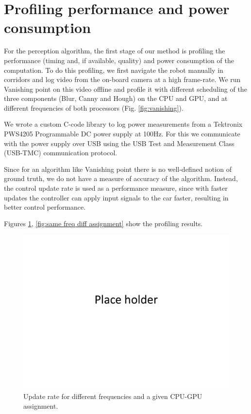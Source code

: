 \section{Profiling performance and power consumption}

For the perception algorithm, the first stage of our method is profiling the performance (timing and, if available, quality) and power consumption of the computation. 
To do this profiling, we first navigate the robot manually in corridors and log video from the on-board camera at a high frame-rate. 
We run Vanishing point on this video offline and profile it with different scheduling of the three components (Blur, Canny and Hough) on the CPU and GPU, and at different frequencies of both processors (Fig. \ref{fig:vanishing}).

We wrote a custom C-code library to log power measurements from a Tektronix PWS4205 Programmable DC power supply at 100Hz. 
For this we communicate with the power supply over USB using the USB Test and Measurement Class (USB-TMC) communication protocol. 

Since for an algorithm like Vanishing point there is no well-defined notion of ground truth, we do not have a measure of accuracy of the algorithm. 
Instead, the control update rate is used as a performance measure, since with faster updates the controller can apply input signals to the car faster, resulting in better control performance. 

Figures \ref{fig:diff freq same assignment}, \ref{fig:same freq diff assignment} show the profiling results.
\begin{figure}[t]
\centering
\includegraphics[scale=0.2]{Figs/placeHolder}
\caption{Update rate for different frequencies and a given CPU-GPU assignment.}
\label{fig:diff freq same assignment}
\end{figure}

